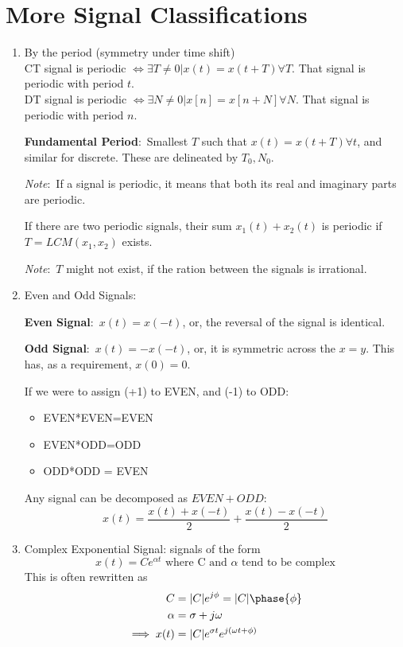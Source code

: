 \documentclass[nobib]{tufte-handout}
\newcommand{\defn}[2]{
        \begin{defbox}
        \noindent\textbf{#1}:\ #2
        \end{defbox}
}
\newcommand{\note}[1]{
        \begin{notebox}
        \noindent\textit{Note}:\ #1
        \end{notebox}
}
\begin{document}
\section{More Signal Classifications}
\begin{enumerate}[start = 3]
    \item By the period (symmetry under time shift)\\
    CT signal is periodic $\iff \exists T\neq 0 | x(t)=x(t+T) \forall T$. That signal is periodic with period $t$.\\
    DT signal is periodic $\iff \exists N\neq 0 | x[n]=x[n+N] \forall N$. That signal is periodic with period $n$.
    \defn{Fundamental Period}{Smallest $T$ such that $x(t)=x(t+T)\forall t$, and similar for discrete. These are delineated by $T_0,N_0$.}
    \note{If a signal is periodic, it means that both its real and imaginary parts are periodic.}
    If there are two periodic signals, their sum $x_1(t)+x_2(t)$ is periodic if $T = LCM(x_1,x_2)$ exists.
    \note{$T$ might not exist, if the ration between the signals is irrational.}
    \item Even and Odd Signals:
    \defn{Even Signal}{$x(t) = x(-t)$, or, the reversal of the signal is identical.}
    \defn{Odd Signal}{$x(t) = -x(-t)$, or, it is symmetric across the $x=y$. This has, as a requirement, $x(0) = 0$.}
    If we were to assign (+1) to EVEN, and (-1) to ODD:
    \begin{itemize}
        \item EVEN*EVEN=EVEN
        \item EVEN*ODD=ODD
        \item ODD*ODD = EVEN
    \end{itemize}
    Any signal can be decomposed as $EVEN+ODD$:
    \begin{equation*}
        x(t) = \frac{x(t)+x(-t)}{2}+\frac{x(t)-x(-t)}{2}
    \end{equation*}
    \item Complex Exponential Signal: signals of the form
    \begin{equation*}
        x(t) = Ce^{\alpha t} \text{ where C and $\alpha$ tend to be complex}
    \end{equation*}
    This is often rewritten as
    \begin{align*}
        C &= |C|e^{j\phi} = |C|\phase{\phi} \\
        \alpha &= \sigma + j\omega \\
        \implies x(t) &= |C|e^{\sigma t}e^{j(\omega t + \phi)}
    \end{align*}

\end{enumerate}
\end{document}
